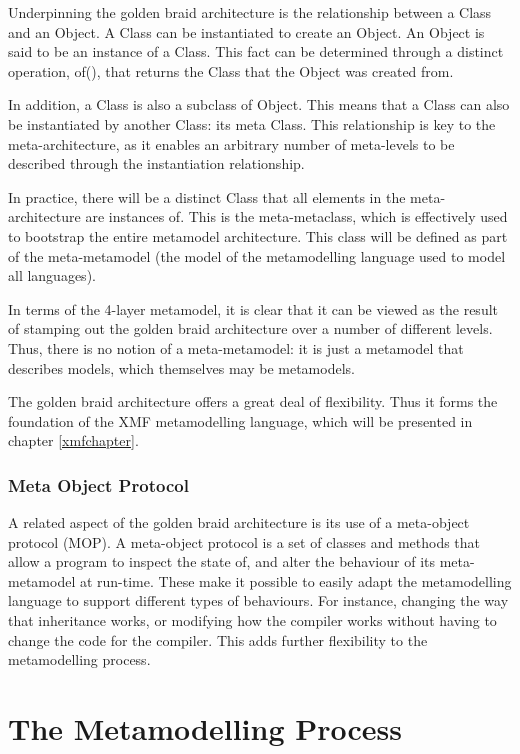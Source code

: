 Underpinning the golden braid architecture is the relationship
between a Class and an Object. A Class can be instantiated to
create an Object. An Object is said to be an instance of a Class.
This fact can be determined through a distinct operation, of(),
that returns the Class that the Object was created from.

In addition, a Class is also a subclass of Object. This means that
a Class can also be instantiated by another Class: its meta Class.
This relationship is key to the meta-architecture, as it enables
an arbitrary number of meta-levels to be described through the
instantiation relationship.

In practice, there will be a distinct Class that all elements in
the meta-architecture are instances of. This is the
meta-metaclass, which is effectively used to bootstrap the entire
metamodel architecture. This class will be defined as part of the
meta-metamodel (the model of the metamodelling language used to
model all languages).

In terms of the 4-layer metamodel, it is clear that it can be
viewed as the result of stamping out the golden braid architecture
over a number of different levels. Thus, there is no notion of a
meta-metamodel: it is just a metamodel that describes models,
which themselves may be metamodels.

The golden braid architecture offers a great deal of flexibility.
Thus it forms the foundation of the XMF metamodelling language,
which will be presented in chapter \ref{xmfchapter}.

\subsubsection{Meta Object Protocol}

A related aspect of the golden braid architecture is its use of a
meta-object protocol (MOP). A meta-object protocol is a set of
classes and methods that allow a program to inspect the state of,
and alter the behaviour of its meta-metamodel at run-time. These
make it possible to easily adapt the metamodelling language to
support different types of behaviours. For instance, changing the
way that inheritance works, or modifying how the compiler works
without having to change the code for the compiler. This adds
further flexibility to the metamodelling process.

\section{The Metamodelling Process}

